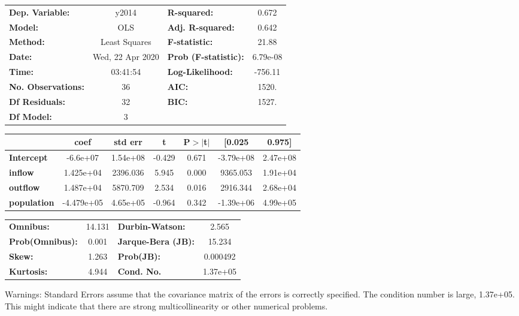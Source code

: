\begin{center}
\begin{tabular}{lclc}
\toprule
\textbf{Dep. Variable:}    &      y2014       & \textbf{  R-squared:         } &     0.672   \\
\textbf{Model:}            &       OLS        & \textbf{  Adj. R-squared:    } &     0.642   \\
\textbf{Method:}           &  Least Squares   & \textbf{  F-statistic:       } &     21.88   \\
\textbf{Date:}             & Wed, 22 Apr 2020 & \textbf{  Prob (F-statistic):} &  6.79e-08   \\
\textbf{Time:}             &     03:41:54     & \textbf{  Log-Likelihood:    } &   -756.11   \\
\textbf{No. Observations:} &          36      & \textbf{  AIC:               } &     1520.   \\
\textbf{Df Residuals:}     &          32      & \textbf{  BIC:               } &     1527.   \\
\textbf{Df Model:}         &           3      & \textbf{                     } &             \\
\bottomrule
\end{tabular}
\begin{tabular}{lcccccc}
                    & \textbf{coef} & \textbf{std err} & \textbf{t} & \textbf{P$> |$t$|$} & \textbf{[0.025} & \textbf{0.975]}  \\
\midrule
\textbf{Intercept}  &     -6.6e+07  &     1.54e+08     &    -0.429  &         0.671        &    -3.79e+08    &     2.47e+08     \\
\textbf{inflow}     &    1.425e+04  &     2396.036     &     5.945  &         0.000        &     9365.053    &     1.91e+04     \\
\textbf{outflow}    &    1.487e+04  &     5870.709     &     2.534  &         0.016        &     2916.344    &     2.68e+04     \\
\textbf{population} &   -4.479e+05  &     4.65e+05     &    -0.964  &         0.342        &    -1.39e+06    &     4.99e+05     \\
\bottomrule
\end{tabular}
\begin{tabular}{lclc}
\textbf{Omnibus:}       & 14.131 & \textbf{  Durbin-Watson:     } &    2.565  \\
\textbf{Prob(Omnibus):} &  0.001 & \textbf{  Jarque-Bera (JB):  } &   15.234  \\
\textbf{Skew:}          &  1.263 & \textbf{  Prob(JB):          } & 0.000492  \\
\textbf{Kurtosis:}      &  4.944 & \textbf{  Cond. No.          } & 1.37e+05  \\
\bottomrule
\end{tabular}
\end{center}

Warnings: \newline
 [1] Standard Errors assume that the covariance matrix of the errors is correctly specified. \newline
 [2] The condition number is large, 1.37e+05. This might indicate that there are \newline
 strong multicollinearity or other numerical problems.